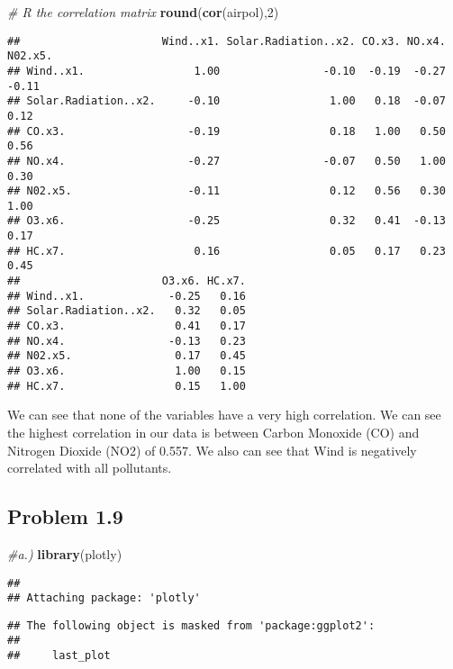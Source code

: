 \documentclass[
]{article}
\newenvironment{Shaded}{\begin{snugshade}}{\end{snugshade}}
\newcommand{\CommentTok}[1]{\textcolor[rgb]{0.56,0.35,0.01}{\textit{#1}}}
\newcommand{\DecValTok}[1]{\textcolor[rgb]{0.00,0.00,0.81}{#1}}
\newcommand{\KeywordTok}[1]{\textcolor[rgb]{0.13,0.29,0.53}{\textbf{#1}}}
\newcommand{\NormalTok}[1]{#1}
\begin{document}
\begin{Shaded}
\begin{Highlighting}[]
\CommentTok{# R the correlation matrix}
\KeywordTok{round}\NormalTok{(}\KeywordTok{cor}\NormalTok{(airpol),}\DecValTok{2}\NormalTok{)}
\end{Highlighting}
\end{Shaded}

\begin{verbatim}
##                      Wind..x1. Solar.Radiation..x2. CO.x3. NO.x4. N02.x5.
## Wind..x1.                 1.00                -0.10  -0.19  -0.27   -0.11
## Solar.Radiation..x2.     -0.10                 1.00   0.18  -0.07    0.12
## CO.x3.                   -0.19                 0.18   1.00   0.50    0.56
## NO.x4.                   -0.27                -0.07   0.50   1.00    0.30
## N02.x5.                  -0.11                 0.12   0.56   0.30    1.00
## O3.x6.                   -0.25                 0.32   0.41  -0.13    0.17
## HC.x7.                    0.16                 0.05   0.17   0.23    0.45
##                      O3.x6. HC.x7.
## Wind..x1.             -0.25   0.16
## Solar.Radiation..x2.   0.32   0.05
## CO.x3.                 0.41   0.17
## NO.x4.                -0.13   0.23
## N02.x5.                0.17   0.45
## O3.x6.                 1.00   0.15
## HC.x7.                 0.15   1.00
\end{verbatim}

We can see that none of the variables have a very high correlation. We
can see the highest correlation in our data is between Carbon Monoxide
(CO) and Nitrogen Dioxide (NO2) of 0.557. We also can see that Wind is
negatively correlated with all pollutants.

\hypertarget{problem-1.9}{%
\subsection{Problem 1.9}\label{problem-1.9}}

\begin{Shaded}
\begin{Highlighting}[]
\CommentTok{#a.)}
\KeywordTok{library}\NormalTok{(plotly)}
\end{Highlighting}
\end{Shaded}

\begin{verbatim}
## 
## Attaching package: 'plotly'
\end{verbatim}

\begin{verbatim}
## The following object is masked from 'package:ggplot2':
## 
##     last_plot
\end{verbatim}
\end{document}
